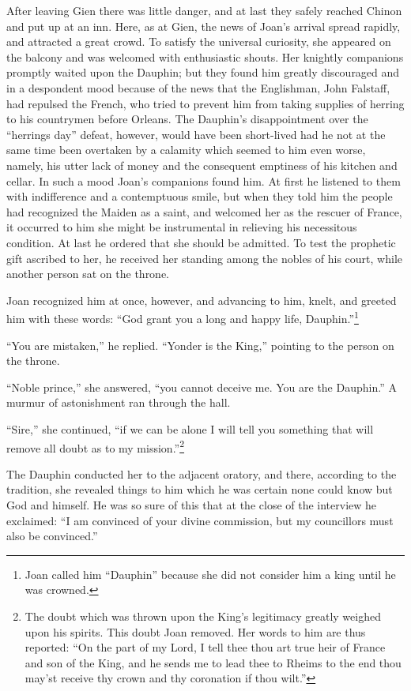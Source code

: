 After leaving Gien there was little danger, and at last they safely
reached Chinon and put up at an inn. Here, as at Gien, the news of
Joan's arrival spread rapidly, and attracted a great crowd. To satisfy
the universal curiosity, she appeared on the balcony and was welcomed
with enthusiastic shouts. Her knightly companions promptly waited upon
the Dauphin; but they found him greatly discouraged and in a despondent
mood because of the news that the Englishman, John Falstaff, had
repulsed the French, who tried to prevent him from taking supplies of
herring to his countrymen before Orleans. The Dauphin's disappointment
over the ``herrings day'' defeat, however, would have been short-lived
had he not at the same time been overtaken by a calamity which seemed to
him even worse, namely, his utter lack of money and the consequent
emptiness of his kitchen and cellar. In such a mood Joan's companions
found him. At first he listened to them with indifference and a
contemptuous smile, but when they told him the people had recognized the
Maiden as a saint, and welcomed her as the rescuer of France, it
occurred to him she might be instrumental in relieving his necessitous
condition. At last he ordered that she should be admitted. To test the
prophetic gift ascribed to her, he received her standing among the
nobles of his court, while another person sat on the throne.

Joan recognized him at once, however, and advancing to him, knelt, and
greeted him with these words: ``God grant you a long and happy life,
Dauphin.''\footnote{Joan called him ``Dauphin'' because she did not
  consider him a king until he was crowned.}

``You are mistaken,'' he replied. ``Yonder is the King,'' pointing to
the person on the throne.

``Noble prince,'' she answered, ``you cannot deceive me. You are the
Dauphin.'' A murmur of astonishment ran through the hall.

``Sire,'' she continued, ``if we can be alone I will tell you something
that will remove all doubt as to my mission.''\footnote{The doubt which
  was thrown upon the King's legitimacy greatly weighed upon his
  spirits. This doubt Joan removed. Her words to him are thus reported:
  ``On the part of my Lord, I tell thee thou art true heir of France and
  son of the King, and he sends me to lead thee to Rheims to the end
  thou may'st receive thy crown and thy coronation if thou wilt.''}

The Dauphin conducted her to the adjacent oratory, and there, according
to the tradition, she revealed things to him which he was certain none
could know but God and himself. He was so sure of this that at the close
of the interview he exclaimed: ``I am convinced of your divine
commission, but my councillors must also be convinced.''

